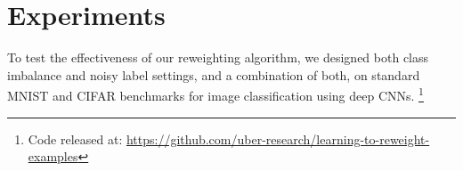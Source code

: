 
\section{Experiments}

To test the effectiveness of our reweighting algorithm, we designed both class imbalance and noisy
label settings, and a combination of both, on standard MNIST and CIFAR benchmarks for image
classification using deep CNNs.
\footnote{Code released at: \url{https://github.com/uber-research/learning-to-reweight-examples}}


